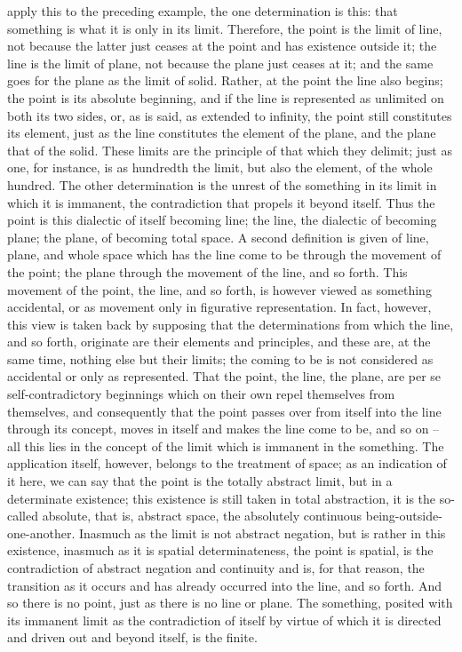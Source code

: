 apply this to the preceding example, the one determination is this: that
something is what it is only in its limit. Therefore, the point is the limit of
line, not because the latter just ceases at the point and has existence outside
it; the line is the limit of plane, not because the plane just ceases at it; and
the same goes for the plane as the limit of solid. Rather, at the point the line
also begins; the point is its absolute beginning, and if the line is represented
as unlimited on both its two sides, or, as is said, as extended to infinity, the
point still constitutes its element, just as the line constitutes the element
of the plane, and the plane that of the solid. These limits are the principle
of that which they delimit; just as one, for instance, is as hundredth the
limit, but also the element, of the whole hundred.
The other determination is the unrest of the something in its limit in
which it is immanent, the contradiction that propels it beyond itself. Thus
the point is this dialectic of itself becoming line; the line, the dialectic of
becoming plane; the plane, of becoming total space. A second definition
is given of line, plane, and whole space which has the line come to be
through the movement of the point; the plane through the movement of
the line, and so forth. This movement of the point, the line, and so forth, is
however viewed as something accidental, or as movement only in figurative
representation. In fact, however, this view is taken back by supposing that
the determinations from which the line, and so forth, originate are their
elements and principles, and these are, at the same time, nothing else but
their limits; the coming to be is not considered as accidental or only as
represented. That the point, the line, the plane, are per se self-contradictory
beginnings which on their own repel themselves from themselves, and
consequently that the point passes over from itself into the line through
its concept, moves in itself and makes the line come to be, and so on – all
this lies in the concept of the limit which is immanent in the something.
The application itself, however, belongs to the treatment of space; as an
indication of it here, we can say that the point is the totally abstract limit,
but in a determinate existence; this existence is still taken in total abstraction,
it is the so-called absolute, that is, abstract space, the absolutely continuous
being-outside-one-another. Inasmuch as the limit is not abstract negation,
but is rather in this existence, inasmuch as it is spatial determinateness, the
point is spatial, is the contradiction of abstract negation and continuity
and is, for that reason, the transition as it occurs and has already occurred
into the line, and so forth. And so there is no point, just as there is no line
or plane.
The something, posited with its immanent limit as the contradiction of
itself by virtue of which it is directed and driven out and beyond itself, is
the finite.

